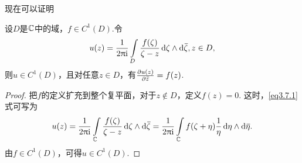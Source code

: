 现在可以证明
\begin{theorem}\label{thm3.7.3}
  设$D$是$\mathbb C$中的域，$f\in C^1(D)$.令
  \begin{equation}\label{eq3.7.1}
    u(z) = \frac1{2\uppi\mathrm i}\int\limits_D\frac{f(\zeta)}{\zeta-z}\mathop{}\!\mathrm{d} \zeta\wedge\mathop{}\!\mathrm{d} {}\mkern2mu\overline{\mkern-2mu\zeta},z\in D,
  \end{equation}
  则$u\in C^1(D)$，且对任意$z\in D$，有$\frac{\partial u(z)}{\partial {}\mkern2mu\overline{\mkern-2muz}}=f(z)$.
\end{theorem}
\begin{proof}
  把$f$的定义扩充到整个复平面，对于$z\notin D$，定义$f(z)=0$. 这时，\eqref{eq3.7.1} 式可写为
  \[
    u(z) = \frac1{2\uppi\mathrm i}\int\limits_\mathbb C\frac{f(\zeta)}{\zeta-z}\mathop{}\!\mathrm{d} \zeta\wedge\mathop{}\!\mathrm{d} {}\mkern2mu\overline{\mkern-2mu\zeta}=\frac1{2\uppi\mathrm i}\int\limits_\mathbb C f(\zeta+\eta)\frac1\eta\mathop{}\!\mathrm{d} \eta\wedge\mathop{}\!\mathrm{d} {}\mkern2mu\overline{\mkern-2mu\eta}.
  \]
  由$f\in C^1(D)$，可得$u\in C^1(D)$.


\end{proof}
